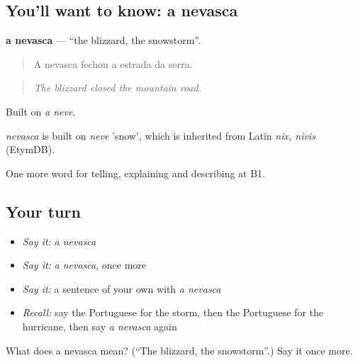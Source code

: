 \subsection*{You'll want to know: a nevasca}
\textbf{a nevasca} — \textquotedblleft{}the blizzard, the snowstorm\textquotedblright{}.

\begin{quote}
A nevasca fechou a estrada da serra.
\end{quote}

\begin{quote}
\emph{The blizzard closed the mountain road.}
\end{quote}

Built on \emph{a neve}.

\begin{cousinweb}
\emph{nevasca} is built on \emph{neve} 'snow', which is inherited from Latin \emph{nix, nivis} (EtymDB).
\end{cousinweb}

\begin{grammarlens}[title={What you've built}]
One more word for telling, explaining and describing at B1.
\end{grammarlens}

\subsection*{Your turn}
\begin{itemize}
\raggedright
  \item \emph{Say it:} \emph{a nevasca}
  \item \emph{Say it:} \emph{a nevasca}, once more
  \item \emph{Say it:} a sentence of your own with \emph{a nevasca}
  \item \emph{Recall:} say the Portuguese for the storm, then the Portuguese for the hurricane, then say \emph{a nevasca} again
\end{itemize}

\begin{tcolorbox}[breakable,colback=teal!4,colframe=teal!35!black,title={Before you move on}]
What does a nevasca mean? (\textquotedblleft{}The blizzard, the snowstorm\textquotedblright{}.) Say it once more.
\end{tcolorbox}
